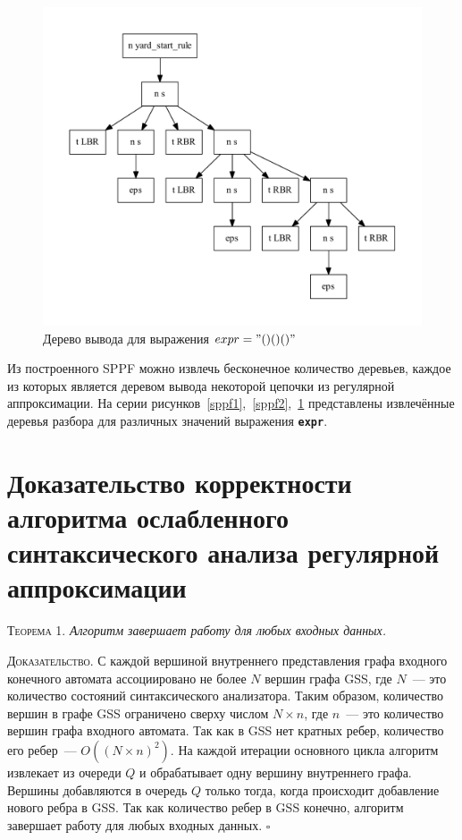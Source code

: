 \begin{figure}[!h]
 \centering
 \includegraphics[width=.7\textwidth]{pics/sppf3.pdf}
 \caption{Дерево вывода для выражения $expr="()()()"$}
 \label{sppf3}
\end{figure}

Из построенного SPPF можно извлечь бесконечное количество деревьев, каждое из которых является деревом вывода некоторой цепочки из регулярной аппроксимации. На серии рисунков~\ref{sppf1},~\ref{sppf2},~\ref{sppf3} представлены извлечённые деревья разбора для различных значений выражения \textbf{\texttt{expr}}.  


\section{Доказательство корректности алгоритма ослабленного синтаксического анализа регулярной аппроксимации}

\textsc{Теорема 1.} 
\textit{Алгоритм завершает работу для любых входных данных.}

\textsc{Доказательство.}
С каждой вершиной внутреннего представления графа входного конечного автомата ассоциировано не более $N$ вершин графа GSS, где $N$~--- это количество состояний синтаксического анализатора. Таким образом, количество вершин в графе GSS ограничено сверху числом $N \times n$, где $n$~--- это количество вершин графа входного автомата. Так как в GSS нет кратных ребер, количество его ребер~--- $O((N \times n)^{2})$. На каждой итерации основного цикла алгоритм извлекает из очереди $Q$ и обрабатывает одну вершину внутреннего графа. Вершины добавляются в очередь $Q$ только тогда, когда происходит добавление нового ребра в GSS. Так как количество ребер в GSS конечно, алгоритм завершает работу для любых входных данных. $\square$


